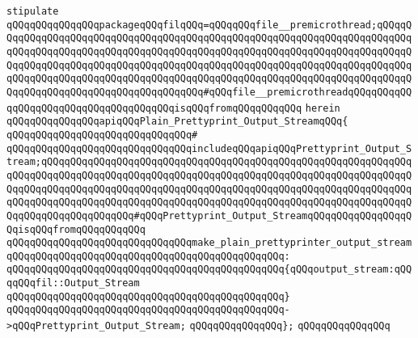 \newline
\newline
\verb|stipulate|\newline
\verb|qQQqqQQqqQQqqQQqpackageqQQqfilqQQq=qQQqqQQqfile__premicrothread;qQQqqQQqqQQqqQQqqQQqqQQqqQQqqQQqqQQqqQQqqQQqqQQqqQQqqQQqqQQqqQQqqQQqqQQqqQQqqQQqqQQqqQQqqQQqqQQqqQQqqQQqqQQqqQQqqQQqqQQqqQQqqQQqqQQqqQQqqQQqqQQqqQQqqQQqqQQqqQQqqQQqqQQqqQQqqQQqqQQqqQQqqQQqqQQqqQQqqQQqqQQqqQQqqQQqqQQqqQQqqQQqqQQqqQQqqQQqqQQqqQQqqQQqqQQqqQQqqQQqqQQqqQQqqQQqqQQqqQQqqQQqqQQqqQQqqQQqqQQqqQQqqQQqqQQqqQQqqQQq#qQQqfile__premicrothreadqQQqqQQqqQQqqQQqqQQqqQQqqQQqqQQqqQQqqQQqisqQQqfromqQQqqQQqqQQq|\newline
\verb|herein|\newline
\newline
\verb|qQQqqQQqqQQqqQQqapiqQQqPlain_Prettyprint_Output_StreamqQQq{|\newline
\verb|qQQqqQQqqQQqqQQqqQQqqQQqqQQqqQQq#|\newline
\verb|qQQqqQQqqQQqqQQqqQQqqQQqqQQqqQQqincludeqQQqapiqQQqPrettyprint_Output_Stream;qQQqqQQqqQQqqQQqqQQqqQQqqQQqqQQqqQQqqQQqqQQqqQQqqQQqqQQqqQQqqQQqqQQqqQQqqQQqqQQqqQQqqQQqqQQqqQQqqQQqqQQqqQQqqQQqqQQqqQQqqQQqqQQqqQQqqQQqqQQqqQQqqQQqqQQqqQQqqQQqqQQqqQQqqQQqqQQqqQQqqQQqqQQqqQQqqQQqqQQqqQQqqQQqqQQqqQQqqQQqqQQqqQQqqQQqqQQqqQQqqQQqqQQqqQQqqQQqqQQqqQQqqQQqqQQqqQQqqQQqqQQqqQQqqQQqqQQq#qQQqPrettyprint_Output_StreamqQQqqQQqqQQqqQQqqQQqisqQQqfromqQQqqQQqqQQq|\newline
\newline
\verb|qQQqqQQqqQQqqQQqqQQqqQQqqQQqqQQqmake_plain_prettyprinter_output_stream|\newline
\verb|qQQqqQQqqQQqqQQqqQQqqQQqqQQqqQQqqQQqqQQqqQQqqQQq:|\newline
\verb|qQQqqQQqqQQqqQQqqQQqqQQqqQQqqQQqqQQqqQQqqQQqqQQq{qQQqoutput_stream:qQQqqQQqfil::Output_Stream|\newline
\verb|qQQqqQQqqQQqqQQqqQQqqQQqqQQqqQQqqQQqqQQqqQQqqQQq}|\newline
\verb|qQQqqQQqqQQqqQQqqQQqqQQqqQQqqQQqqQQqqQQqqQQqqQQq->qQQqPrettyprint_Output_Stream;|\newline
\verb|qQQqqQQqqQQqqQQq};|\newline
\verb|qQQqqQQqqQQqqQQq|\newline
\newline
